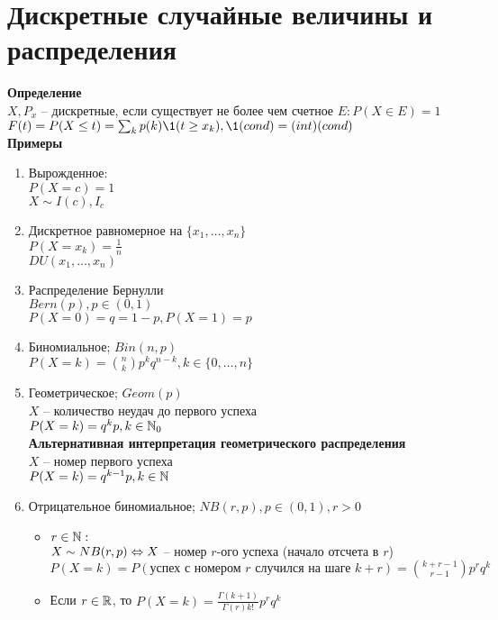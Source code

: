 \documentclass[12pt]{article}
\begin{document}
\section{Дискретные случайные величины и распределения}
\textbf{Определение}\\
$X, P_x$ -- дискретные, если существует не более чем счетное $E: P(X \in E) = 1$\\
$F(t) = P(X \leq t) = \sum_k p(k) \1(t \geq x_k), \1(cond) = (int)(cond)$\\
\textbf{Примеры}
\begin{enumerate}
    \item Вырожденное:\\
    $P(X=c) = 1$\\
    $X \sim I(c), I_c$
    \item Дискретное равномерное на $\{x_1, \ldots, x_n\}$\\
    $P(X = x_k) = \frac1n$\\
    $DU(x_1, \ldots, x_n)$
    \item Распределение Бернулли\\
    $Bern(p), p \in (0, 1)$\\
    $P(X = 0) = q = 1-p, P(X = 1) = p$
    \item Биномиальное; $Bin(n, p)$\\
    $P(X = k) = \binom{n}{k} p^k q^{n-k}, k \in \{0, \ldots, n\}$
    \item Геометрическое; $Geom(p)$\\
    $X$ -- количество неудач до первого успеха\\
    $P(X = k) = q^k p, k \in \mathbb{N}_0$\\
    \textbf{Альтернативная интерпретация геометрического распределения}\\
    $X$ -- номер первого успеха\\
    $P(X=k)=q^{k-1}p, k \in \mathbb{N}$
    \item Отрицательное биномиальное; $NB(r, p), p \in (0, 1), r > 0$
    \begin{itemize}
        \item $r \in \mathbb{N}:$\\
        $X \sim NB(r, p) \Leftrightarrow X$ -- номер $r$-ого успеха (начало отсчета в $r$)\\
        $P(X=k) = P(\text{успех с номером $r$ случился на шаге $k+r$}) = \binom{k+r-1}{r-1} p^r q^{k}$
        \item Если $r \in \mathbb{R}$, то $P(X = k) = \frac{\Gamma(k+1)}{\Gamma(r)k!} p^r q^k$
    \end{itemize}

\end{enumerate}
\end{document}
